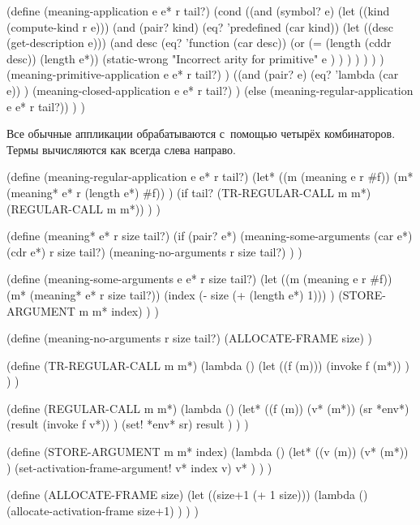 \begin{code:lisp}
(define (meaning-application e e* r tail?)
  (cond ((and (symbol? e)
              (let ((kind (compute-kind r e)))
                (and (pair? kind)
                     (eq? 'predefined (car kind))
                     (let ((desc (get-description e)))
                       (and desc
                            (eq? 'function (car desc))
                            (or (= (length (cddr desc)) (length e*))
                                (static-wrong
                                 "Incorrect arity for primitive" e )
                                ) ) ) ) ) )
         (meaning-primitive-application e e* r tail?) )
        ((and (pair? e)
              (eq? 'lambda (car e)) )
         (meaning-closed-application e e* r tail?) )
        (else (meaning-regular-application e e* r tail?)) ) )
\end{code:lisp}

Все обычные аппликации обрабатываются с~помощью четырёх комбинаторов. Термы
вычисляются как всегда слева направо.

\begin{code:lisp}
(define (meaning-regular-application e e* r tail?)
  (let* ((m (meaning e r #f))
         (m* (meaning* e* r (length e*) #f)) )
    (if tail? (TR-REGULAR-CALL m m*) (REGULAR-CALL m m*)) ) )

(define (meaning* e* r size tail?)
  (if (pair? e*)
      (meaning-some-arguments (car e*) (cdr e*) r size tail?)
      (meaning-no-arguments r size tail?) ) )

(define (meaning-some-arguments e e* r size tail?)
  (let ((m (meaning e r #f))
        (m* (meaning* e* r size tail?))
        (index (- size (+ (length e*) 1))) )
    (STORE-ARGUMENT m m* index) ) )

(define (meaning-no-arguments r size tail?)
  (ALLOCATE-FRAME size) )

(define (TR-REGULAR-CALL m m*)
  (lambda ()
    (let ((f (m)))
      (invoke f (m*)) ) ) )

(define (REGULAR-CALL m m*)
  (lambda ()
    (let* ((f  (m))
           (v* (m*))
           (sr *env*)
           (result (invoke f v*)) )
      (set! *env* sr)
      result ) ) )

(define (STORE-ARGUMENT m m* index)
  (lambda ()
    (let* ((v  (m))
           (v* (m*)) )
      (set-activation-frame-argument! v* index v)
      v* ) ) )

(define (ALLOCATE-FRAME size)
  (let ((size+1 (+ 1 size)))
    (lambda ()
      (allocate-activation-frame size+1) ) ) )
\end{code:lisp}


